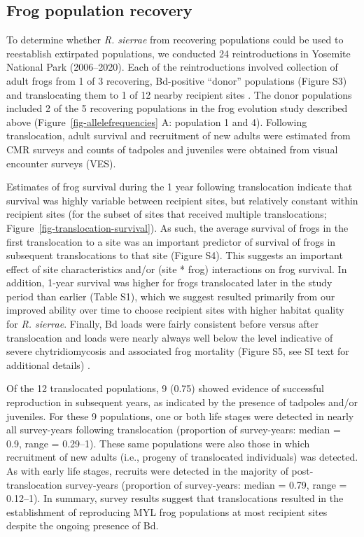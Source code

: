 \documentclass[9pt,twocolumn,twoside,lineno]{pnas-new}
\begin{document}
\subsection*{Frog population recovery}

To determine whether \emph{R. sierrae} from recovering populations could
be used to reestablish extirpated populations, we conducted 24
reintroductions in Yosemite National Park (2006--2020). Each of the
reintroductions involved collection of adult frogs from 1 of 3
recovering, Bd-positive ``donor'' populations (Figure S3) and translocating them to 1 of 12 nearby recipient sites
\citep{seddon2014}. The donor populations included 2 of the 5 recovering
populations in the frog evolution study described above
(Figure~\ref{fig-allelefrequencies} A: population 1 and 4). Following
translocation, adult survival and recruitment of new adults were
estimated from CMR surveys and counts of tadpoles and juveniles were
obtained from visual encounter surveys (VES).

Estimates of frog survival during the 1 year following translocation
indicate that survival was highly variable between recipient sites, but
relatively constant within recipient sites (for the subset of sites that
received multiple translocations;
Figure~\ref{fig-translocation-survival}). As such, the average survival
of frogs in the first translocation to a site was an important predictor
of survival of frogs in subsequent translocations to that site
(Figure S4). This suggests an important
effect of site characteristics and/or (site * frog) interactions on frog
survival. In addition, 1-year survival was higher for frogs translocated
later in the study period than earlier
(Table S1), which we suggest resulted
primarily from our improved ability over time to choose recipient sites
with higher habitat quality for \emph{R. sierrae}. Finally, Bd loads
were fairly consistent before versus after translocation and loads were
nearly always well below the level indicative of severe chytridiomycosis
and associated frog mortality (Figure S5,
see SI text for additional details) \citep{joseph2018, vredenburg2010}.

Of the 12 translocated populations, 9 (0.75) showed evidence of
successful reproduction in subsequent years, as indicated by the
presence of tadpoles and/or juveniles. For these 9 populations, one or
both life stages were detected in nearly all survey-years following
translocation (proportion of survey-years: median = 0.9, range =
0.29--1). These same populations were also those in which recruitment of
new adults (i.e., progeny of translocated individuals) was detected. As
with early life stages, recruits were detected in the majority of
post-translocation survey-years (proportion of survey-years: median =
0.79, range = 0.12--1). In summary, survey results suggest that
translocations resulted in the establishment of reproducing MYL frog
populations at most recipient sites despite the ongoing presence of Bd.
\end{document}
